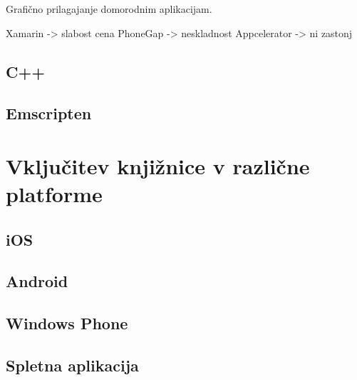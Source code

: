 Grafično prilagajanje domorodnim aplikacijam.

Xamarin -> slabost cena
PhoneGap -> neskladnost
Appcelerator -> ni zastonj

\section{C++}

\section{Emscripten}

\chapter{Vključitev knjižnice v različne platforme}
\label{chap:cross-platform}

\section{iOS}

\section{Android}

\section{Windows Phone}

\section{Spletna aplikacija}
